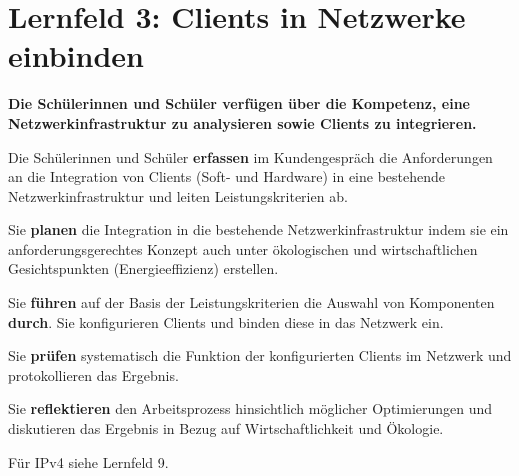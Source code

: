 \chapter{Lernfeld 3: Clients in Netzwerke einbinden}

\textbf{Die Schülerinnen und Schüler verfügen über die Kompetenz, eine Netzwerkinfrastruktur zu analysieren sowie Clients zu integrieren.}

Die Schülerinnen und Schüler \textbf{erfassen} im Kundengespräch die Anforderungen an die Integration von Clients (Soft- und Hardware) in eine bestehende Netzwerkinfrastruktur und
leiten Leistungskriterien ab.

Sie \textbf{planen} die Integration in die bestehende Netzwerkinfrastruktur indem sie ein anforderungsgerechtes Konzept auch unter ökologischen und wirtschaftlichen Gesichtspunkten
(Energieeffizienz) erstellen.

Sie \textbf{führen} auf der Basis der Leistungskriterien die Auswahl von Komponenten \textbf{durch}. Sie
konfigurieren Clients und binden diese in das Netzwerk ein.

Sie \textbf{prüfen} systematisch die Funktion der konfigurierten Clients im Netzwerk und protokollieren das Ergebnis.

Sie \textbf{reflektieren} den Arbeitsprozess hinsichtlich möglicher Optimierungen und diskutieren
das Ergebnis in Bezug auf Wirtschaftlichkeit und Ökologie.

Für IPv4 siehe Lernfeld 9.
